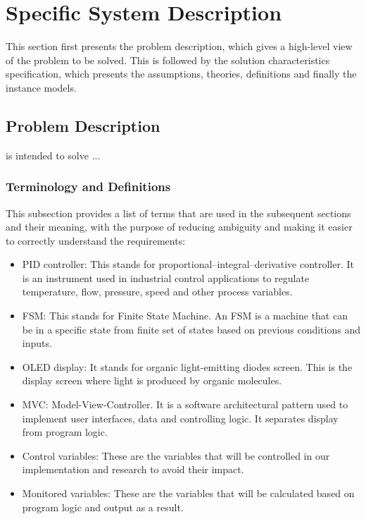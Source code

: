 \documentclass[12pt]{article}
\begin{document}
\section{Specific System Description}

This section first presents the problem description, which gives a high-level
view of the problem to be solved.  This is followed by the solution characteristics
specification, which presents the assumptions, theories, definitions and finally
the instance models.  

\subsection{Problem Description} \label{Sec_pd}

\progname{} is intended to solve ... 

\subsubsection{Terminology and  Definitions}

This subsection provides a list of terms that are used in the subsequent
sections and their meaning, with the purpose of reducing ambiguity and making it
easier to correctly understand the requirements:

\begin{itemize}

  \item PID controller: This stands for proportional–integral–derivative controller. It is an instrument used in industrial control applications to regulate temperature, flow, pressure, speed and other process variables.
  \item FSM: This stands for Finite State Machine. An FSM is a machine that can be in a specific state from finite set of states based on previous conditions and inputs.
  \item OLED display: It stands for organic light-emitting diodes screen. This is the display screen where light is produced by organic molecules.
  \item MVC: Model-View-Controller. It is a software architectural pattern used to implement user interfaces, data and controlling logic. It separates display from program logic.
  \item Control variables: These are the variables that will be controlled in our implementation and research to avoid their impact.
  \item Monitored variables: These are the variables that will be calculated based on program logic and output as a result.

\end{itemize}
\end{document}
